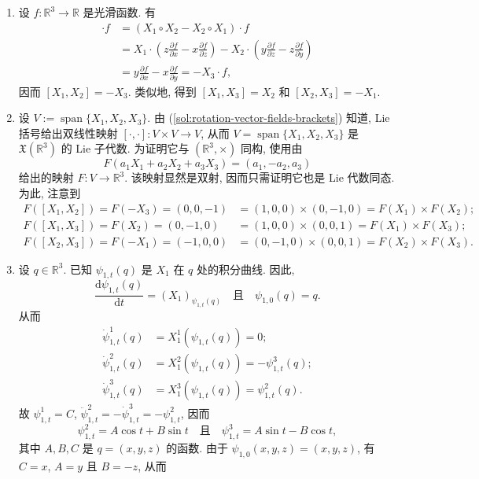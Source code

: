 \begin{description}[font=\normalfont,leftmargin=2em,labelwidth=1.5em]
\begin{enumerate}[label=(\alph*),ref=\alph*,leftmargin=*]
\item\label{sol:rotation-vector-fields-brackets} 设 $f:\mathbb{R}^3\to\mathbb{R}$ 是光滑函数. 有
\begin{align*}
  [X_1,X_2]\cdot f&=(X_1\circ X_2-X_2\circ X_1)\cdot f\\
  &=X_1\cdot\left(z\frac{\partial f}{\partial x}-x\frac{\partial f}{\partial z}\right)
    -X_2\cdot\left(y\frac{\partial f}{\partial z}-z\frac{\partial f}{\partial y}\right)\\
  &=y\frac{\partial f}{\partial x}-x\frac{\partial f}{\partial y}=-X_3\cdot f,
\end{align*}
因而 $[X_1,X_2]=-X_3$. 类似地, 得到 $[X_1,X_3]=X_2$ 和 $[X_2,X_3]=-X_1$.
\item 设 $V:=\operatorname{span}\{X_1,X_2,X_3\}$. 由 (\ref{sol:rotation-vector-fields-brackets}) 知道, Lie 括号给出双线性映射 $[\cdot,\cdot]:V\times V\to V$, 从而 $V=\operatorname{span}\{X_1,X_2,X_3\}$ 是 $\mathfrak{X}(\mathbb{R}^3)$ 的 Lie 子代数. 为证明它与 $(\mathbb{R}^3,\times)$ 同构, 使用由
\[
  F(a_1X_1+a_2X_2+a_3X_3)=(a_1,-a_2,a_3)
\]
给出的映射 $F:V\to\mathbb{R}^3$. 该映射显然是双射, 因而只需证明它也是 Lie 代数同态. 为此, 注意到
\begin{align*}
  F([X_1,X_2])=F(-X_3)=(0,0,-1)
  &=(1,0,0)\times(0,-1,0)=F(X_1)\times F(X_2);\\
  F([X_1,X_3])=F(X_2)=(0,-1,0)
  &=(1,0,0)\times(0,0,1)=F(X_1)\times F(X_3);\\
  F([X_2,X_3])=F(-X_1)=(-1,0,0)
  &=(0,-1,0)\times(0,0,1)=F(X_2)\times F(X_3).
\end{align*}
\item 设 $q\in\mathbb{R}^3$. 已知 $\psi_{1,t}(q)$ 是 $X_1$ 在 $q$ 处的积分曲线. 因此,
\[
  \frac{\mathrm{d}\psi_{1,t}(q)}{\mathrm{d}t}=(X_1)_{\psi_{1,t}(q)}
  \quad\text{且}\quad\psi_{1,0}(q)=q.
\]
从而
\begin{align*}
  \dot\psi^1_{1,t}(q)&=X_1^1(\psi_{1,t}(q))=0;\\
  \dot\psi^2_{1,t}(q)&=X_1^2(\psi_{1,t}(q))=-\psi^3_{1,t}(q);\\
  \dot\psi^3_{1,t}(q)&=X_1^3(\psi_{1,t}(q))=\psi^2_{1,t}(q).
\end{align*}
故 $\psi^1_{1,t}=C$, $\ddot\psi^2_{1,t}=-\dot\psi^3_{1,t}=-\psi^2_{1,t}$, 因而
\[
  \psi^2_{1,t}=A\cos t+B\sin t
  \quad\text{且}\quad\psi^3_{1,t}=A\sin t-B\cos t,
\]
其中 $A,B,C$ 是 $q=(x,y,z)$ 的函数. 由于 $\psi_{1,0}(x,y,z)=(x,y,z)$, 有 $C=x$, $A=y$ 且 $B=-z$, 从而

\end{enumerate}
\end{description}
